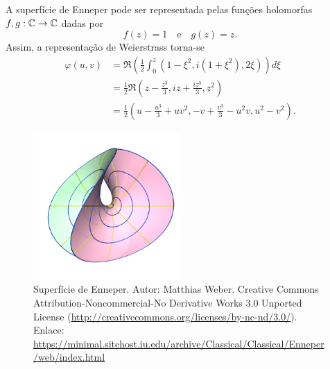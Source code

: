 \begin{exemplo}
	A superfície de Enneper pode ser representada pelas funções holomorfas $f,g: \mathbb{C} \rightarrow \mathbb{C}$ dadas por
	\begin{equation*}
	f(z) = 1 \quad \text{e} \quad
	g(z) = z.
	\end{equation*}
	Assim, a representação de Weierstrass torna-se
	\begin{align*}
	\varphi(u,v) &= \Re \left( \frac{1}{2} \int_{0}^{z} \left( 1 - \xi^2, i (1 + \xi^2), 2\xi \right) \right) d\xi \\
	&= \frac{1}{2} \Re \left( z - \frac{z^3}{3}, iz + \frac{iz^3}{3}, z^2 \right) \\
	&= \frac{1}{2} \left( u - \frac{u^3}{3} + uv^2, -v + \frac{v^3}{3} - u^2v, u^2 - v^2 \right).
	\end{align*}
\end{exemplo}

\begin{figure}
	\centering
	\includegraphics[width=0.5\textwidth]{images/enneper}
	\caption{Superfície de Enneper. Autor: Matthias Weber. Creative Commons Attribution-Noncommercial-No Derivative Works 3.0 Unported License (\url{http://creativecommons.org/licenses/by-nc-nd/3.0/}). Enlace: \url{https://minimal.sitehost.iu.edu/archive/Classical/Classical/Enneper/web/index.html}}
\end{figure}

